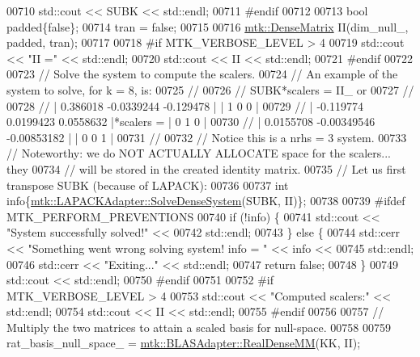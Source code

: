 \begin{DoxyCode}
{{00710   std::cout << SUBK << std::endl;
00711 \textcolor{preprocessor}{  #endif}
00712 
00713   \textcolor{keywordtype}{bool} padded\{\textcolor{keyword}{false}\};
00714   tran = \textcolor{keyword}{false};
00715 
00716   \hyperlink{classmtk_1_1DenseMatrix}{mtk::DenseMatrix} II(dim\_null\_, padded, tran);
00717 
00718 \textcolor{preprocessor}{  #if MTK\_VERBOSE\_LEVEL > 4}
00719   std::cout << \textcolor{stringliteral}{"II ="} << std::endl;
00720   std::cout << II << std::endl;
00721 \textcolor{preprocessor}{  #endif}
00722 
00723   \textcolor{comment}{// Solve the system to compute the scalers.}
00724   \textcolor{comment}{// An example of the system to solve, for k = 8, is:}
00725   \textcolor{comment}{//}
00726   \textcolor{comment}{// SUBK*scalers = II\_ or}
00727   \textcolor{comment}{//}
00728   \textcolor{comment}{// |  0.386018  -0.0339244   -0.129478 |           | 1 0 0 |}
00729   \textcolor{comment}{// | -0.119774   0.0199423   0.0558632 |*scalers = | 0 1 0 |}
00730   \textcolor{comment}{// | 0.0155708 -0.00349546 -0.00853182 |           | 0 0 1 |}
00731   \textcolor{comment}{//}
00732   \textcolor{comment}{// Notice this is a nrhs = 3 system.}
00733   \textcolor{comment}{// Noteworthy: we do NOT ACTUALLY ALLOCATE space for the scalers... they}
00734   \textcolor{comment}{// will be stored in the created identity matrix.}
00735   \textcolor{comment}{// Let us first transpose SUBK (because of LAPACK):}
00736 
00737   \textcolor{keywordtype}{int} info\{\hyperlink{classmtk_1_1LAPACKAdapter_a7428bccf74fd4a4af68fb7233846da22}{mtk::LAPACKAdapter::SolveDenseSystem}(SUBK, II)\};
00738 
00739 \textcolor{preprocessor}{  #ifdef MTK\_PERFORM\_PREVENTIONS}
00740   \textcolor{keywordflow}{if} (!info) \{
00741     std::cout << \textcolor{stringliteral}{"System successfully solved!"} <<
00742       std::endl;
00743   \} \textcolor{keywordflow}{else} \{
00744     std::cerr << \textcolor{stringliteral}{"Something went wrong solving system! info = "} << info <<
00745       std::endl;
00746     std::cerr << \textcolor{stringliteral}{"Exiting..."} << std::endl;
00747     \textcolor{keywordflow}{return} \textcolor{keyword}{false};
00748   \}
00749   std::cout << std::endl;
00750 \textcolor{preprocessor}{  #endif}
00751 
00752 \textcolor{preprocessor}{  #if MTK\_VERBOSE\_LEVEL > 4}
00753   std::cout << \textcolor{stringliteral}{"Computed scalers:"} << std::endl;
00754   std::cout << II << std::endl;
00755 \textcolor{preprocessor}{  #endif}
00756 
00757   \textcolor{comment}{// Multiply the two matrices to attain a scaled basis for null-space.}
00758 
00759   rat\_basis\_null\_space\_ = \hyperlink{classmtk_1_1BLASAdapter_acebd0e9bfe0bdd609c7fbea98ccfd3b5}{mtk::BLASAdapter::RealDenseMM}(KK, II);
}}
\end{DoxyCode}
